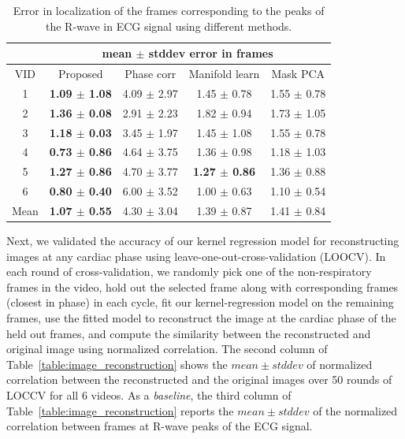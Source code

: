 \documentclass[journal]{IEEEtran}
\begin{document}
%
\vspace{-0.3cm}
\begin{table}[h]
\begin{minipage}[t]{0.95\linewidth}
\centering
\caption{Error in localization of the frames corresponding to the peaks of the R-wave in ECG signal using different methods.}
\setlength\tabcolsep{3pt} 
\begin{tabular}{|c|c|c|c|c|}
\hline
\multicolumn{1}{|l|}{} & \multicolumn{4}{c|}{mean $\pm$ stddev error in frames} \\ \hline
VID & Proposed & Phase corr\cite{Karadayi2006} & Manifold learn\cite{Wachinger2012} & Mask PCA\cite{Panayiotou2014} \\ \hline
1 & \bf{1.09 $\pm$ 1.08} & 4.09 $\pm$ 2.97 & 1.45 $\pm$ 0.78 & 1.55 $\pm$ 0.78 \\ \hline
2 & \bf{1.36 $\pm$ 0.08} & 2.91 $\pm$ 2.23 & 1.82 $\pm$ 0.94 & 1.73 $\pm$ 1.05 \\ \hline
3 & \bf{1.18 $\pm$ 0.03} & 3.45 $\pm$ 1.97 & 1.45 $\pm$ 1.08 & 1.55 $\pm$ 0.78 \\ \hline
4 & \bf{0.73 $\pm$ 0.86} & 4.64 $\pm$ 3.75 & 1.36 $\pm$ 0.98 & 1.18 $\pm$ 1.03 \\ \hline
5 & \bf{1.27 $\pm$ 0.86} & 4.70 $\pm$ 3.77 & \bf{1.27 $\pm$ 0.86} & 1.36 $\pm$ 0.88 \\ \hline
6 & \bf{0.80 $\pm$ 0.40} & 6.00 $\pm$ 3.52 & 1.00 $\pm$ 0.63 & 1.10 $\pm$ 0.54 \\ \hline \hline
Mean & \bf{1.07 $\pm$ 0.55} & 4.30 $\pm$ 3.04 & 1.39 $\pm$ 0.87 & 1.41 $\pm$ 0.84\\
\hline
\end{tabular}
\label{table:R_peak_localization}
\end{minipage}
\end{table}
%	


Next, we validated the accuracy of our kernel regression model for reconstructing images at any cardiac phase using leave-one-out-cross-validation (LOOCV). In each round of cross-validation, we randomly pick one of the non-respiratory frames in the video, hold out the selected frame along with corresponding frames (closest in phase) in each cycle, fit our kernel-regression model on the remaining frames, use the fitted model to reconstruct the image at the cardiac phase of the held out frames, and compute the similarity between the reconstructed and original image using normalized correlation. The second column of Table~\ref{table:image_reconstruction} shows the $mean \pm stddev$ of normalized correlation between the reconstructed and the original images over 50 rounds of LOCCV for all 6 videos. As a \emph{baseline}, the third column of Table~\ref{table:image_reconstruction} reports the $mean \pm stddev$ of the normalized correlation between frames at R-wave peaks of the ECG signal. 
\end{document}
